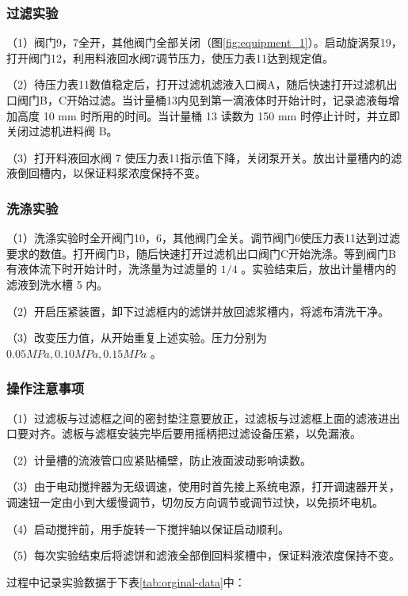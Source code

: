 \subsubsection{过滤实验}

（1）阀门9，7全开，其他阀门全部关闭（图\ref{fig:equipment_1}）。启动旋涡泵19，打开阀门12，利用料液回水阀7调节压力，使压力表11达到规定值。

（2）待压力表11数值稳定后，打开过滤机滤液入口阀A，随后快速打开过滤机出口阀门B，C开始过滤。当计量桶13内见到第一滴液体时开始计时，记录滤液每增加高度 10 mm 时所用的时间。当计量桶 13 读数为 150 mm 时停止计时，并立即关闭过滤机进料阀 B。

（3）打开料液回水阀 7 使压力表11指示值下降，关闭泵开关。放出计量槽内的滤液倒回槽内，以保证料浆浓度保持不变。

\subsubsection{洗涤实验}

（1）洗涤实验时全开阀门10，6，其他阀门全关。调节阀门6使压力表11达到过滤要求的数值。打开阀门B，随后快速打开过滤机出口阀门C开始洗涤。等到阀门B有液体流下时开始计时，洗涤量为过滤量的 $1 / 4$ 。实验结束后，放出计量槽内的滤液到洗水槽 5 内。

（2）开启压紧装置，卸下过滤框内的滤饼并放回滤浆槽内，将滤布清洗干净。

（3）改变压力值，从开始重复上述实验。压力分别为 $0.05 MPa,0.10 MPa, 0.15 MPa$ 。

\subsubsection{操作注意事项}

（1）过滤板与过滤框之间的密封垫注意要放正，过滤板与过滤框上面的滤液进出口要对齐。滤板与滤框安装完毕后要用摇柄把过滤设备压紧，以免漏液。

（2）计量槽的流液管口应紧贴桶壁，防止液面波动影响读数。

（3）由于电动搅拌器为无级调速，使用时首先接上系统电源，打开调速器开关，调速钮一定由小到大缓慢调节，切勿反方向调节或调节过快，以免损坏电机。

（4）启动搅拌前，用手旋转一下搅拌轴以保证启动顺利。

（5）每次实验结束后将滤饼和滤液全部倒回料浆槽中，保证料液浓度保持不变。

过程中记录实验数据于下表\ref{tab:orginal-data}中：

